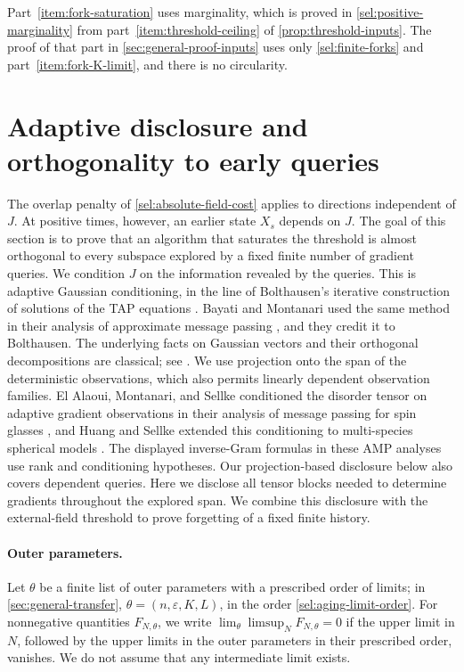 Part~\ref{item:fork-saturation} uses marginality, which is proved in
\cref{sel:positive-marginality} from part~\ref{item:threshold-ceiling} of
\cref{prop:threshold-inputs}. The proof of that part in
\cref{sec:general-proof-inputs} uses only \cref{sel:finite-forks} and
part~\ref{item:fork-K-limit}, and there is no circularity.

\section{Adaptive disclosure and orthogonality to early queries}
\label{sec:general-disclosure}

The overlap penalty of \cref{sel:absolute-field-cost} applies to directions
independent of $J$. At positive times, however, an earlier state $X_s$ depends on $J$. The goal of this section is to prove that an algorithm that saturates the threshold is almost
orthogonal to every subspace explored by a fixed finite number of gradient
queries. We condition $J$ on the information revealed by the queries. This is adaptive Gaussian conditioning, in the line of Bolthausen's
iterative construction of solutions of the TAP equations
\cite[Section~3]{bolthausen2014}. Bayati and Montanari used the same method
in their analysis of approximate message passing
\cite[arXiv version~4, Section~3.8, Lemma~11]{bayatimontanari2011}, and
they credit it to Bolthausen. The underlying facts on Gaussian vectors and
their orthogonal decompositions are classical; see \cite[Chapter~9, Theorem~9.1, pp.~127--128, and Theorems~9.8--9.9, pp.~131--132]{janson1997}. We use projection onto the span of the deterministic observations, which also permits linearly dependent observation families.
El Alaoui, Montanari, and Sellke conditioned the disorder tensor on adaptive
gradient observations in their analysis of message passing for spin
glasses \cite[arXiv version~1, Appendix~A, Lemma~A.2, and Theorem~7(a)]{eams2021}, and Huang and Sellke extended this conditioning to
multi-species spherical models \cite[arXiv version~1, Appendix~A, Lemma~A.2, and Theorem~3(a)]{hs2024amp}. The displayed inverse-Gram formulas in these AMP analyses use rank and conditioning hypotheses. Our projection-based disclosure below also covers dependent queries. Here we disclose all tensor blocks needed to
determine gradients throughout the explored span. We combine this disclosure with the external-field threshold to prove forgetting of a fixed
finite history.

\paragraph{Outer parameters.}
Let $\theta$ be a finite list of outer parameters with a prescribed order of
limits; in \cref{sec:general-transfer}, $\theta=(n,\varepsilon,K,L)$, in the
order \eqref{sel:aging-limit-order}. For nonnegative quantities
$F_{N,\theta}$, we write $\lim_\theta\limsup_NF_{N,\theta}=0$ if the upper
limit in $N$, followed by the upper limits in the outer parameters in their
prescribed order, vanishes. We do not assume that any intermediate limit
exists.

